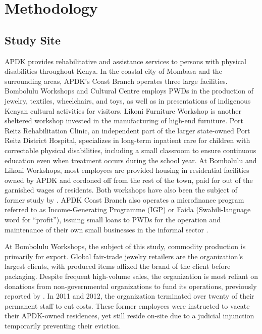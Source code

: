 \documentclass[american]{../../../coursework}
\begin{document}
\section{Methodology}

\subsection{Study Site}

APDK provides rehabilitative and assistance services to persons with physical
disabilities throughout Kenya. In the coastal city of Mombasa and the
surrounding areas, APDK's Coast Branch operates three large facilities.
Bombolulu Workshops and Cultural Centre employs PWDs in the production of
jewelry, textiles, wheelchairs, and toys, as well as in presentations of
indigenous Kenyan cultural activities for visitors. Likoni Furniture Workshop
is another sheltered workshop invested in the manufacturing of high-end
furniture. Port Reitz Rehabilitation Clinic, an independent part of the larger
state-owned Port Reitz District Hospital, specializes in long-term inpatient
care for children with correctable physical disabilities, including a small
classroom to ensure continuous education even when treatment occurs during the
school year. At Bombolulu and Likoni Workshops, most employees are provided
housing in residential facilities owned by APDK and cordoned off from the rest
of the town, paid for out of the garnished wages of residents. Both workshops
have also been the subject of former study by \textcite{Cobley2012}. APDK
Coast Branch also operates a microfinance program referred to as
Income-Generating Programme (IGP) or Faida (Swahili-language word for
``profit''), issuing small loans to PWDs for the operation and maintenance of
their own small businesses in the informal sector \parencites[for further
discussion of the Faida program, see][]{Wameyo2015}[also][]{Cobley2012}.

At Bombolulu Workshops, the subject of this study, commodity production is
primarily for export. Global fair-trade jewelry retailers are the
organization's largest clients, with produced items affixed the brand of the
client before packaging. Despite frequent high-volume sales, the organization
is most reliant on donations from non-governmental organizations to fund its
operations, previously reported by \textcite{Cobley2012}. In 2011 and 2012,
the organization terminated over twenty of their permanent staff to cut costs.
These former employees were instructed to vacate their APDK-owned residences,
yet still reside on-site due to a judicial injunction temporarily preventing
their eviction. 
\end{document}
